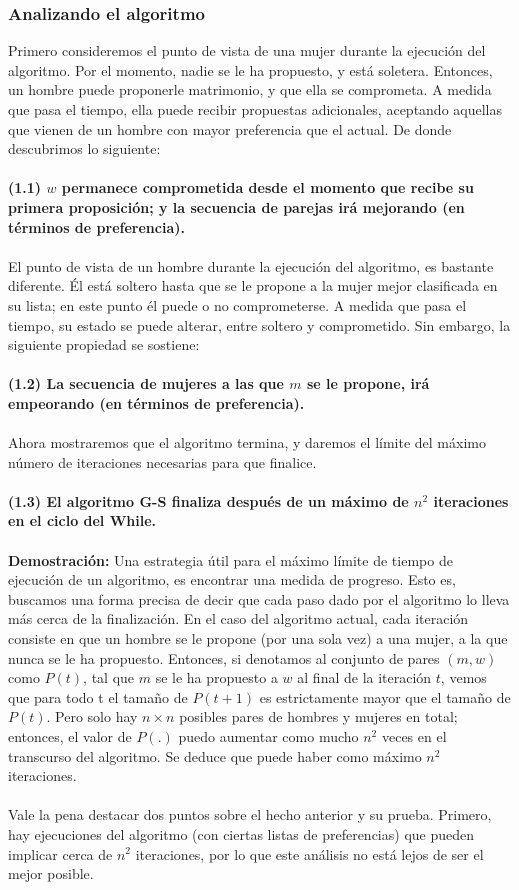 \documentclass[a4paper]{article}
\begin{document}
\subsubsection*{Analizando el algoritmo}  
Primero consideremos el punto de vista de una mujer durante la ejecución del algoritmo. Por el momento, nadie se le ha propuesto, y  está soletera. Entonces, un hombre puede proponerle matrimonio, y que ella se comprometa. A medida que pasa el tiempo, ella puede recibir propuestas adicionales, aceptando aquellas que vienen de un hombre con mayor preferencia que el actual. De donde descubrimos lo siguiente:
\\
 \\
    \textbf{(1.1) $w$ permanece comprometida desde el momento que recibe su primera proposición; y la secuencia de parejas irá mejorando (en términos de preferencia).}
    \\ 
    \\ 
    El punto de vista de un hombre durante la ejecución del algoritmo, es bastante diferente. Él está soltero hasta que se le propone a la mujer mejor clasificada en su lista; en este punto él puede o no comprometerse. A medida que pasa el tiempo, su estado se puede alterar, entre soltero y comprometido. Sin embargo, la siguiente propiedad se sostiene:
   \\ 
   \\ 
        \textbf{(1.2) La secuencia de mujeres a las que $m$ se le propone, irá empeorando (en términos de preferencia).}
  \\ 
   \\ 
  Ahora mostraremos que el algoritmo termina, y daremos el límite del máximo número de iteraciones necesarias para que finalice.
   \\ 
     \\ 
        \textbf{(1.3)  El algoritmo G-S finaliza después de un máximo de $n^ 2$ iteraciones en el ciclo del While.}
  \\
  \\ 
  \textbf{Demostración:} Una estrategia útil para el  máximo límite de tiempo de ejecución de un algoritmo, es encontrar una medida de progreso. Esto es, buscamos una forma precisa de decir que cada paso dado por el algoritmo lo lleva más cerca de la finalización.
  En el caso del algoritmo actual, cada iteración consiste en que un hombre se le propone (por una sola vez) a una mujer, a la que nunca se le ha propuesto. Entonces, si denotamos al conjunto de pares $(m, w)$ como $P(t)$, tal que $m$ se le ha propuesto a $w$ al final de la iteración $t$, vemos que para todo t el tamaño de $P(t+1)$ es estrictamente mayor que el tamaño de $P(t)$. Pero solo hay $n \times n$ posibles pares de hombres y mujeres en total; entonces, el valor de $P(.)$ puedo aumentar como mucho $n^ 2$ veces en el transcurso del algoritmo. Se deduce que puede haber como máximo $n^ 2$ iteraciones. 
  \\ 
  \\ 
  	Vale la pena destacar dos puntos sobre el hecho anterior y su prueba. Primero, hay ejecuciones del algoritmo (con ciertas listas de preferencias) que pueden implicar cerca de $n^ 2$ iteraciones, por lo que este análisis no está lejos de ser el mejor posible.
      \\
    
\end{document}
